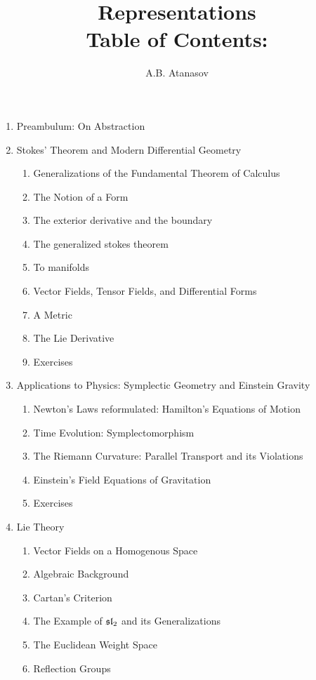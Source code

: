 \documentclass{article}
\begin{document}
\title{Representations\\ Table of Contents:}
\date{}
\author{A.B. Atanasov}
\maketitle

\begin{enumerate}
	\item Preambulum: On Abstraction
	\item Stokes' Theorem and Modern Differential Geometry
	\begin{enumerate}
		\item Generalizations of the Fundamental Theorem of Calculus
		\item The Notion of a Form
		\item The exterior derivative and the boundary
		\item The generalized stokes theorem
		\item To manifolds
		\item Vector Fields, Tensor Fields, and Differential Forms
		\item A Metric
		\item The Lie Derivative
		\item Exercises
	\end{enumerate}
	\item Applications to Physics: Symplectic Geometry and Einstein Gravity
	\begin{enumerate}
		\item Newton's Laws reformulated: Hamilton's Equations of Motion
		\item Time Evolution: Symplectomorphism
		\item The Riemann Curvature: Parallel Transport and its Violations
		\item Einstein's Field Equations of Gravitation
		\item Exercises
	\end{enumerate}
	\item Lie Theory
	\begin{enumerate}
		\item Vector Fields on a Homogenous Space
		\item Algebraic Background
		\item Cartan's Criterion
		\item The Example of $\frak{sl}_2$ and its Generalizations
		\item The Euclidean Weight Space
		\item Reflection Groups

\end{enumerate}
\end{enumerate}
\end{document}

